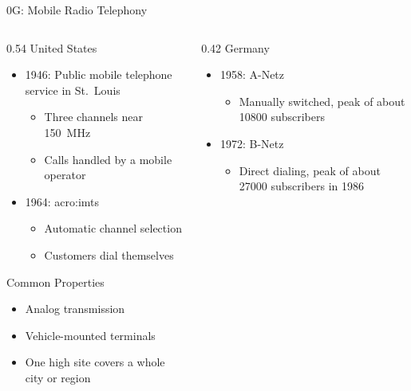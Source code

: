 \begin{frame}{0G: Mobile Radio Telephony}
  \begin{columns}[T,onlytextwidth]
    \begin{column}{0.54\textwidth}
      United States~\cite{young-amps}
      \begin{itemize}
        \item 1946: Public mobile telephone service in St.\ Louis
          \begin{itemize}
            \item Three channels near \qty{150}{\mega\hertz}
            \item Calls handled by a mobile operator
          \end{itemize}
        \item 1964: \gls{acro:imts}
          \begin{itemize}
            \item Automatic channel selection
            \item Customers dial themselves
          \end{itemize}
      \end{itemize}
      \vspace{0.4em}
      Common Properties
      \begin{itemize}
        \item Analog transmission
        \item Vehicle-mounted terminals
        \item One high site covers a whole city or region
      \end{itemize}
    \end{column}
    \begin{column}{0.42\textwidth}
      Germany
      \begin{itemize}
        \item 1958: A-Netz
          \begin{itemize}
            \item Manually switched, peak of about \num{10800} subscribers
          \end{itemize}
        \item 1972: B-Netz
          \begin{itemize}
            \item Direct dialing, peak of about \num{27000} subscribers in 1986
          \end{itemize}
      \end{itemize}
    \end{column}
  \end{columns}
\end{frame}

